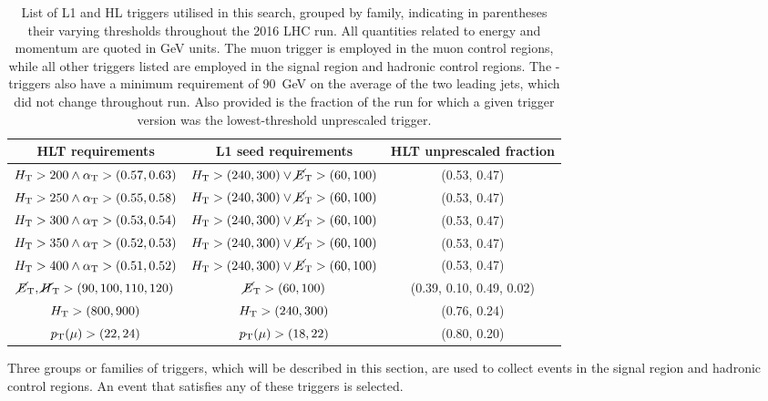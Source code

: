 \begin{table}[h]
\footnotesize
\centering
\begin{tabular}{ccc}
\hline
HLT requirements & L1 seed requirements & HLT unprescaled fraction \\
\hline\hline
$\mbox{$H_\text{T}$}>200 \land \alpha_{\text{T}}>(0.57,0.63)$ & $\mbox{$H_\text{T}$}>(240,300) \lor 
\mbox{$\cancel{E}_\text{T}$}>(60,100)$ 
& (0.53, 0.47) \\
$\mbox{$H_\text{T}$}>250 \land \alpha_{\text{T}}>(0.55,0.58)$ & $\mbox{$H_\text{T}$}>(240,300) \lor 
\mbox{$\cancel{E}_\text{T}$}>(60,100)$ 
& (0.53, 0.47) \\
$\mbox{$H_\text{T}$}>300 \land \alpha_{\text{T}}>(0.53,0.54)$ & $\mbox{$H_\text{T}$}>(240,300) \lor 
\mbox{$\cancel{E}_\text{T}$}>(60,100)$ 
& (0.53, 0.47) \\
$\mbox{$H_\text{T}$}>350 \land \alpha_{\text{T}}>(0.52,0.53)$ & $\mbox{$H_\text{T}$}>(240,300) \lor 
\mbox{$\cancel{E}_\text{T}$}>(60,100)$ 
& (0.53, 0.47) \\
$\mbox{$H_\text{T}$}>400 \land \alpha_{\text{T}}>(0.51,0.52)$ & $\mbox{$H_\text{T}$}>(240,300) \lor 
\mbox{$\cancel{E}_\text{T}$}>(60,100)$ 
& (0.53, 0.47) \\
\hline
$\mbox{$\cancel{E}_\text{T}$}, \mbox{$\cancel{H}_\text{T}$}>(90,100,110,120)$ & $\mbox{$\cancel{E}_\text{T}$}>(60,100)$ & (0.39, 
0.10, 0.49, 0.02) \\
\hline
$\mbox{$H_\text{T}$}>(800,900)$ & $\mbox{$H_\text{T}$}>(240,300)$ & (0.76, 0.24) \\
\hline
${p_{\text T}}(\mu)>(22,24)$ & ${p_{\text T}}(\mu)>(18,22)$ & (0.80, 0.20) \\
\hline
\end{tabular}
\caption{List of L1 and HL triggers utilised in this search, grouped by 
family, 
indicating in parentheses their varying thresholds throughout the 2016 LHC run. 
All quantities related to energy and momentum are quoted in GeV units.
The muon trigger is employed in the muon 
control regions, while all other triggers listed are employed in the signal 
region and hadronic control regions.
The \scalht-\alphat triggers also have a minimum requirement of 90~GeV on the 
average \pt of the two leading jets, which did not change throughout run.
Also provided is the fraction of the run for which a given trigger version was 
the lowest-threshold unprescaled trigger.}
\label{tab:triggers}
\end{table}

Three groups or families of triggers, which will be described in this section, 
are used to collect events in the signal region and hadronic control regions. 
An event that satisfies any of these triggers is selected.

